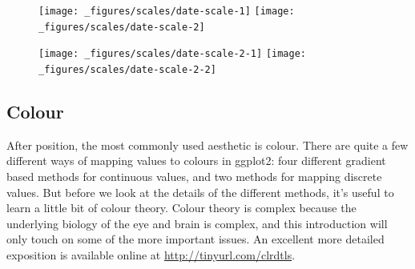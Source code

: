 \begin{figure}[H]
  \texttt{[image: \_figures/scales/date-scale-1]}%
  \texttt{[image: \_figures/scales/date-scale-2]}
\end{figure}

\begin{Shaded}
\end{Shaded}

\begin{figure}[H]
  \texttt{[image: \_figures/scales/date-scale-2-1]}%
  \texttt{[image: \_figures/scales/date-scale-2-2]}
\end{figure}

\subsection{Colour}\label{sub:scale-colour}

After position, the most commonly used aesthetic is colour. There are
quite a few different ways of mapping values to colours in ggplot2: four
different gradient based methods for continuous values, and two methods
for mapping discrete values. But before we look at the details of the
different methods, it's useful to learn a little bit of colour theory.
Colour theory is complex because the underlying biology of the eye and
brain is complex, and this introduction will only touch on some of the
more important issues. An excellent more detailed exposition is
available online at \url{http://tinyurl.com/clrdtls}. 

